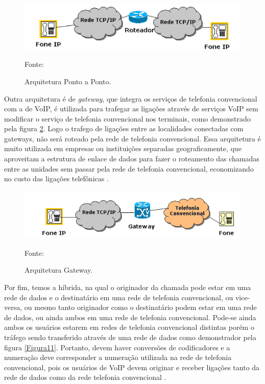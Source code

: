 \begin{figure}[h]
	\centering
	\includegraphics[width=16.0cm]{imagens/pontoaponto.jpg}
	\caption{Arquitetura Ponto a Ponto.}
    \label{Figura9}
    Fonte: \cite{eduardomaronasmonks2006}
\end{figure}

Outra arquitetura é de \textit{gateway}, que integra os serviços de telefonia convencional com a de VoIP, é utilizada para trafegar as ligações através de serviços VoIP sem modificar o serviço de telefonia convencional nos terminais, como demonstrado pela figura \ref{Figura10}. Logo o trafego de ligações entre as localidades conectadas com gateways, não será roteado pela rede de telefonia convencional. Essa arquitetura é muito utilizada em empresas ou instituições separadas geograficamente, que aproveitam a estrutura de enlace de dados para fazer o roteamento das chamadas entre as unidades sem passar pela rede de telefonia convencional, economizando no custo das ligações telefônicas \cite{eduardomaronasmonks2006}.

\begin{figure}[h]
	\centering
	\includegraphics[width=16.0cm]{imagens/gateway.jpg}
	\caption{Arquitetura Gateway.}
    \label{Figura10}
    Fonte: \cite{eduardomaronasmonks2006}
\end{figure}

Por fim, temos a híbrida, na qual o originador da chamada pode estar em uma rede de dados e o destinatário em uma rede de telefonia convencional, ou vice-versa, ou mesmo tanto originador como o destinatário podem estar em uma rede de dados, ou ainda ambos em uma rede de telefonia convencional. Pode-se ainda ambos os usuários estarem em redes de telefonia convencional distintas porém o tráfego sendo transferido através de uma rede de dados como demonstrador pela figura \ref{Figura11}. Portanto, devem haver conversões de codificadores e a numeração deve corresponder a numeração utilizada na rede de telefonia convencional, pois os usuários de VoIP devem originar e receber ligações tanto da rede de dados como da rede telefonia convencional \cite{eduardomaronasmonks2006}.

